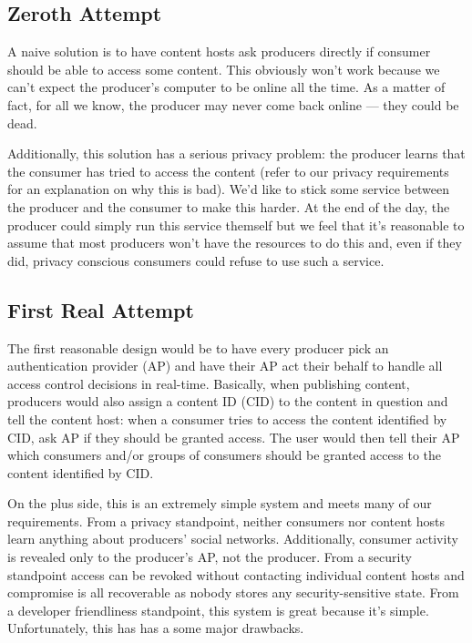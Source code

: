 \documentclass[pdftex,12pt,a4papaer,twoside,notitlepage]{report}
\begin{document}
\subsection{Zeroth Attempt}

A naive solution is to have content hosts ask producers directly if consumer
should be able to access some content. This obviously won't work because we
can't expect the producer's computer to be online all the time. As a matter of
fact, for all we know, the producer may never come back online --- they could be
dead.

Additionally, this solution has a serious privacy problem: the producer learns
that the consumer has tried to access the content (refer to our privacy
requirements for an explanation on why this is bad). We'd like to stick some
service between the producer and the consumer to make this harder. At the end of
the day, the producer could simply run this service themself but we feel that
it's reasonable to assume that most producers won't have the resources to do
this and, even if they did, privacy conscious consumers could refuse to use
such a service.

\subsection{First Real Attempt}

The first reasonable design would be to have every producer pick an
authentication provider (AP) and have their AP act their behalf to handle all
access control decisions in real-time. Basically, when publishing content,
producers would also assign a content ID (CID) to the content in question and
tell the content host: when a consumer tries to access the content identified by
CID, ask AP if they should be granted access. The user would then tell their AP
which consumers and/or groups of consumers should be granted access to the
content identified by CID.

On the plus side, this is an extremely simple system and meets many of our
requirements. From a privacy standpoint, neither consumers nor content hosts learn
anything about producers' social networks. Additionally, consumer activity is
revealed only to the producer's AP, not the producer. From a security standpoint
access can be revoked without contacting individual content hosts and compromise
is all recoverable as nobody stores any security-sensitive state. From a
developer friendliness standpoint, this system is great because it's simple.
Unfortunately, this has has a some major drawbacks.
\end{document}

